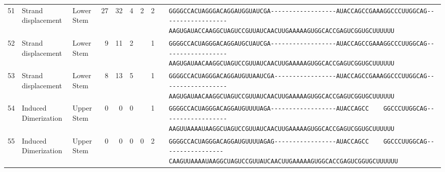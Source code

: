 \begin{tabular}{rllrrrrrcl}
 51 & Strand displacement & Lower Stem & 27 & 32 & 4 & 2 & 2 &  &
 \color{ucsfdarkgrey}\verb|GGGGCCACUAGGGACAGGAU|\color{ucsforange}\verb|GGUAUC|\color{ucsfblue}\verb|GA------------------|\color{ucsfpurple}\verb|AUACCAGCCGAAAGGCCCUUGGCAG|\color{ucsfblue}\verb|------------------AAGU|\color{ucsforange}\verb|GAUACCAA|\color{ucsfnavy}\verb|GGCUAGUCC|\color{ucsforange}\verb|GUUAUCA|\color{ucsfteal}\verb|ACUUGAAAAAGU|\color{ucsforange}\verb|GGCACCGAGUCGGUGCUUUUUU| \\

 52 & Strand displacement & Lower Stem & 9 & 11 & 2 &  & 1 &  &
 \color{ucsfdarkgrey}\verb|GGGGCCACUAGGGACAGGAU|\color{ucsforange}\verb|GCUAUC|\color{ucsfblue}\verb|GA------------------|\color{ucsfpurple}\verb|AUACCAGCCGAAAGGCCCUUGGCAG|\color{ucsfblue}\verb|------------------AAGU|\color{ucsforange}\verb|GAUAACAA|\color{ucsfnavy}\verb|GGCUAGUCC|\color{ucsforange}\verb|GUUAUCA|\color{ucsfteal}\verb|ACUUGAAAAAGU|\color{ucsforange}\verb|GGCACCGAGUCGGUGCUUUUUU| \\

 53 & Strand displacement & Lower Stem & 8 & 13 & 5 &  & 1 &  &
 \color{ucsfdarkgrey}\verb|GGGGCCACUAGGGACAGGAU|\color{ucsforange}\verb|GUUAAU|\color{ucsfblue}\verb|CGA-----------------|\color{ucsfpurple}\verb|AUACCAGCCGAAAGGCCCUUGGCAG|\color{ucsfblue}\verb|------------------AAGU|\color{ucsforange}\verb|GAUAACAA|\color{ucsfnavy}\verb|GGCUAGUCC|\color{ucsforange}\verb|GUUAUCA|\color{ucsfteal}\verb|ACUUGAAAAAGU|\color{ucsforange}\verb|GGCACCGAGUCGGUGCUUUUUU| \\

 54 & Induced Dimerization & Upper Stem & 0 & 0 & 0 &  & 1 &  &
 \color{ucsfdarkgrey}\verb|GGGGCCACUAGGGACAGGAU|\color{ucsforange}\verb|GUUUUA|\color{ucsfblue}\verb|GA------------------|\color{ucsfpurple}\verb|AUACCAGCC    GGCCCUUGGCAG|\color{ucsfblue}\verb|------------------AAGU|\color{ucsforange}\verb|UAAAAUAA|\color{ucsfnavy}\verb|GGCUAGUCC|\color{ucsforange}\verb|GUUAUCA|\color{ucsfteal}\verb|ACUUGAAAAAGU|\color{ucsforange}\verb|GGCACCGAGUCGGUGCUUUUUU| \\

 55 & Induced Dimerization & Upper Stem & 0 & 0 & 0 & 0 & 2 &  &
 \color{ucsfdarkgrey}\verb|GGGGCCACUAGGGACAGGAU|\color{ucsforange}\verb|GUUUUA|\color{ucsfblue}\verb|GAG-----------------|\color{ucsfpurple}\verb|AUACCAGCC    GGCCCUUGGCAG|\color{ucsfblue}\verb|-----------------CAAGU|\color{ucsforange}\verb|UAAAAUAA|\color{ucsfnavy}\verb|GGCUAGUCC|\color{ucsforange}\verb|GUUAUCA|\color{ucsfteal}\verb|ACUUGAAAAAGU|\color{ucsforange}\verb|GGCACCGAGUCGGUGCUUUUUU| \\


\end{tabular}
